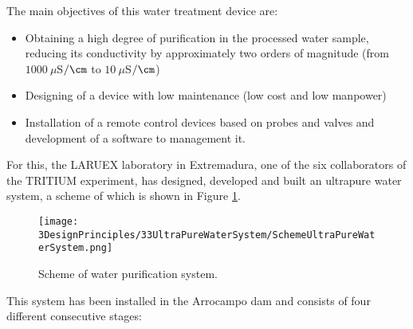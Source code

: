 The main objectives of this water treatment device are:

\begin{itemize}

\item{} Obtaining a high degree of purification in the processed water sample, reducing its conductivity by approximately two orders of magnitude (from $1000~\mu$S$/\cm$ to $10~\mu$S$/\cm$)

\item{} Designing of a device with low maintenance (low cost  and low manpower)

\item{} Installation of a remote control devices based on probes and valves and development of a software to management it.
\end{itemize}

For this, the LARUEX laboratory in Extremadura, one of the six collaborators of the TRITIUM experiment, has designed, developed and built an ultrapure water system, a scheme of which is shown in Figure \ref{fig:WPSScheme}.

\begin{figure}[htbp]
\centering
\texttt{[image: 3DesignPrinciples/33UltraPureWaterSystem/SchemeUltraPureWaterSystem.png]}
\caption{Scheme of water purification system.\label{fig:WPSScheme}}
\end{figure}

This system has been installed in the Arrocampo dam and consists of four different consecutive stages:

